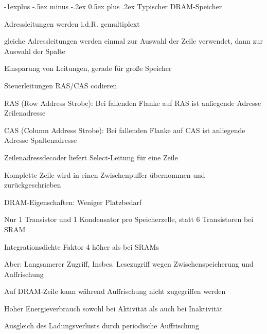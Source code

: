 \documentclass[10pt,landscape]{article}
\makeatletter
\renewcommand{\subsection}{\@startsection{subsection}{2}{0mm}%
                                {-1explus -.5ex minus -.2ex}%
                                {0.5ex plus .2ex}%
                                {\normalfont\normalsize\bfseries}}
\makeatother
\begin{document}
\begin{multicols}{3}
  \subsection{Typischer DRAM-Speicher}
  \begin{itemize*}
    \item Adressleitungen werden i.d.R. gemultiplext
    \item gleiche Adressleitungen werden einmal zur Auswahl der Zeile verwendet, dann zur Auswahl der Spalte
    \item Einsparung von Leitungen, gerade für große Speicher
    \item Steuerleitungen RAS/CAS codieren
    \item RAS (Row Address Strobe): Bei fallenden Flanke auf RAS ist anliegende Adresse Zeilenadresse
    \item CAS (Column Address Strobe): Bei fallenden Flanke auf CAS ist anliegende Adresse Spaltenadresse
    \item Zeilenadressdecoder liefert Select-Leitung für eine Zeile
    \item Komplette Zeile wird in einen Zwischenpuffer übernommen und zurückgeschrieben
    \item DRAM-Eigenschaften: Weniger Platzbedarf
    \item Nur 1 Transistor und 1 Kondensator pro Speicherzelle, statt 6 Transistoren bei SRAM
    \item Integrationsdichte Faktor 4 höher als bei SRAMs
    \item Aber: Langsamerer Zugriff, Insbes. Lesezugriff wegen Zwischenspeicherung und Auffrischung
    \item Auf DRAM-Zeile kann während Auffrischung nicht zugegriffen werden
    \item Hoher Energieverbrauch sowohl bei Aktivität als auch bei Inaktivität
    \item Ausgleich des Ladungsverlusts durch periodische Auffrischung
  \end{itemize*}
  
  

\end{multicols}
\end{document}
